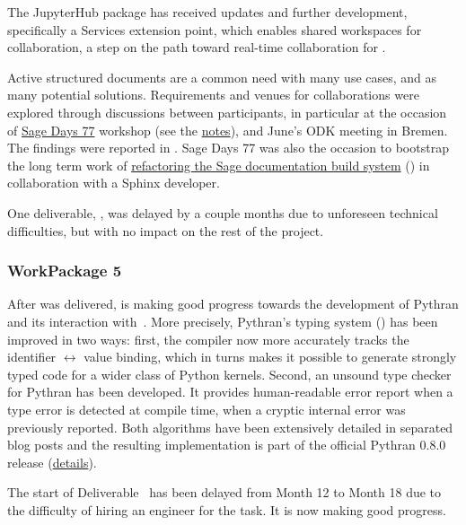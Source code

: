 \documentclass{deliverablereport}
\begin{document}
\begin{itemize}
The JupyterHub package has received updates and further development,
specifically a Services extension point, which enables shared
workspaces for collaboration, a step on the path toward real-time
collaboration for .

Active structured documents are a common need with many use cases, and
as many potential solutions. Requirements and venues for
collaborations were explored through discussions between participants,
in particular at the occasion of
\href{https://wiki.sagemath.org/days77/}{Sage Days 77} workshop (see
the
\href{https://wiki.sagemath.org/days77/live-structured-documents}{notes}),
and June's ODK meeting in Bremen. The findings were reported in
. Sage Days 77 was also the occasion to bootstrap
the long term work of
\href{https://wiki.sagemath.org/days77/documentation}{refactoring the
  Sage documentation build system} () in
collaboration with a Sphinx developer.

One deliverable, , was delayed by a
couple months due to unforeseen technical difficulties, but with no
impact on the rest of the project.


\subsubsection{WorkPackage 5}
After  was delivered,
 is making good progress towards the
development of Pythran and its interaction with~\Sage.
%
More precisely, Pythran's typing system () has
been improved in two ways: first, the compiler now more accurately tracks the
identifier $\leftrightarrow$ value binding, which in turns makes it possible to
generate strongly typed code for a wider class of Python kernels.  Second, an
unsound type checker for Pythran has been developed. It provides human-readable
error report when a type error is detected at compile time, when a cryptic
internal error was previously reported. Both algorithms have been extensively
detailed in separated blog posts and the resulting implementation is part of
the official Pythran 0.8.0 release
(\href{https://github.com/OpenDreamKit/OpenDreamKit/issues/117}{details}).

The start of Deliverable~ has been delayed from
Month 12 to Month 18 due to the difficulty of hiring an engineer for the task.
It is now making good progress.


\end{itemize}
\end{document}
